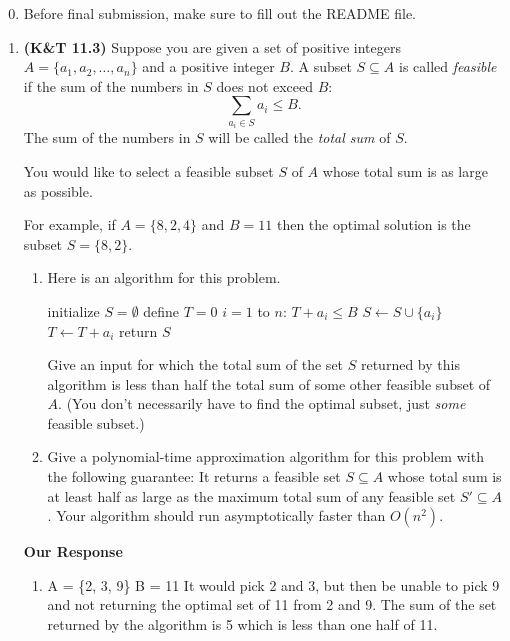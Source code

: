 \documentclass[11pt]{article}
\begin{document}
\begin{enumerate}
  \setcounter{enumi}{-1}
\item Before final submission, make sure to fill out the README file.

  \item {\bf (K\&T 11.3)}
    Suppose you are given a set of positive integers $A=\{a_1, a_2,
    \ldots, a_n\}$ and a positive integer $B$.
    A subset $S \subseteq A$ is called \emph{feasible} if the sum of
    the numbers in $S$ does not exceed $B$:
    $$ \sum_{a_i \in S} a_i \leq B.$$
    The sum of the numbers in $S$ will be called the \emph{total sum}
    of $S$.

    You would like to select a feasible subset $S$ of $A$ whose total
    sum is as large as possible.
    
    For example, if $A=\{8,2,4\}$ and $B=11$ then the optimal solution
    is the subset $S=\{8,2\}$.

    \begin{enumerate}
      \item
      Here is an algorithm for this problem.
      \begin{codebox}
        \li initialize $S = \emptyset$
        \li define $T=0$
        \li \For $i=1$ to $n$: \Do
        \li \If $T + a_i \leq B$ \Then
        \li $S \gets S \cup \{a_i\}$
        \li $T \gets T + a_i$
        \End %
        \End %
        \li return $S$
      \end{codebox}
      Give an input for which the total sum of the set $S$ returned by
      this algorithm is less than half the total sum of some other
      feasible subset of $A$. (You don't necessarily have to find the
      optimal subset, just \emph{some} feasible subset.)

    \item Give a polynomial-time approximation algorithm for this
      problem with the following guarantee:
      It returns a feasible set $S \subseteq A$ whose total sum is at
      least half as large as the maximum total sum of any feasible set
      $S' \subseteq A$.
      Your algorithm should run asymptotically faster than $O(n^2)$.
    \end{enumerate}
    
    \textbf{Our Response}
    \begin{enumerate}
        \item A = \{2, 3, 9\} B = 11
    It would pick 2 and 3, but then be unable to pick 9 and not returning the optimal set of 11 from 2 and 9. The sum of the set returned by the algorithm is 5 which is less than one half of 11.
    

\end{enumerate}
\end{enumerate}
\end{document}
